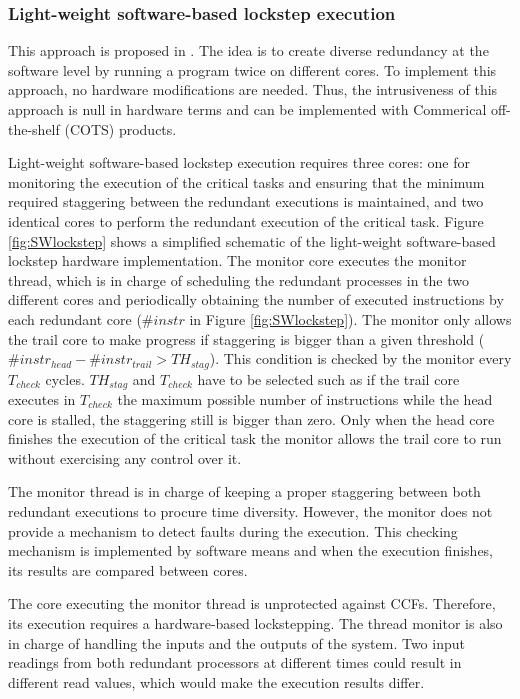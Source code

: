 \bigskip


\subsubsection{Light-weight software-based lockstep execution}
\label{section:software_light_lockstep}

This approach is proposed in \cite{alcaide2020software}. The idea is to create diverse redundancy at the software level by running a program twice on different cores. To implement this approach, no hardware modifications are needed. Thus, the intrusiveness of this approach is null in hardware terms and can be implemented with Commerical off-the-shelf (COTS) products.

Light-weight software-based lockstep execution requires three cores: one for monitoring the execution of the critical tasks and ensuring that the minimum required staggering between the redundant executions is maintained, and two identical cores to perform the redundant execution of the critical task. Figure \ref{fig:SWlockstep} shows a simplified schematic of the light-weight software-based lockstep hardware implementation. The monitor core executes the monitor thread, which is in charge of scheduling the redundant processes in the two different cores and periodically obtaining the number of executed instructions by each redundant core ($\#instr$ in Figure \ref{fig:SWlockstep}). The monitor only allows the trail core to make progress if staggering is bigger than a given threshold  ($\#instr_{head} - \#instr_{trail} > TH_{stag}$). This condition is checked by the monitor every $T_{check}$ cycles. $TH_{stag}$ and $T_{check}$ have to be selected such as if the trail core executes in $T_{check}$ the maximum possible number of instructions while the head core is stalled, the staggering still is bigger than zero. Only when the head core finishes the execution of the critical task the monitor allows the trail core to run without exercising any control over it. 

The monitor thread is in charge of keeping a proper staggering between both redundant executions to procure time diversity. However, the monitor does not provide a mechanism to detect faults during the execution. This checking mechanism is implemented by software means and when the execution finishes, its results are compared between cores.

The core executing the monitor thread is unprotected against CCFs. Therefore, its execution requires a hardware-based lockstepping. The thread monitor is also in charge of handling the inputs and the outputs of the system. Two input readings from both redundant processors at different times could result in different read values, which would make the execution results differ.  


